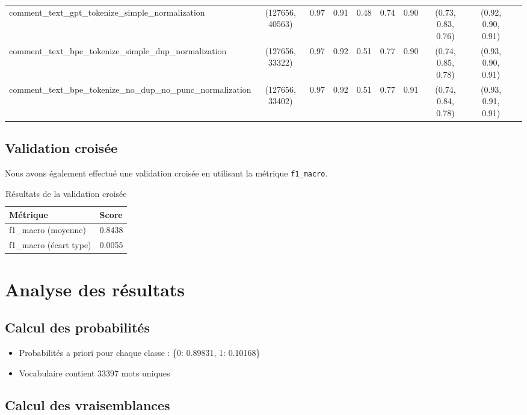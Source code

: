 \begin{table}[htbp]
{\begin{tabular}{@{}lccccccccc@{}}
    comment\_text\_gpt\_tokenize\_simple\_normalization & (127656, 40563) & 0.97 & 0.91 & 0.48 & 0.74 & 0.90 & (0.73, 0.83, 0.76) & (0.92, 0.90, 0.91) \\
    comment\_text\_bpe\_tokenize\_simple\_dup\_normalization & (127656, 33322) & 0.97 & 0.92 & 0.51 & 0.77 & 0.90 & (0.74, 0.85, 0.78) & (0.93, 0.90, 0.91) \\
    comment\_text\_bpe\_tokenize\_no\_dup\_no\_punc\_normalization & (127656, 33402) & 0.97 & 0.92 & 0.51 & 0.77 & 0.91 & (0.74, 0.84, 0.78) & (0.93, 0.91, 0.91) \\
    \bottomrule
    \end{tabular}%
    }
\end{table}


\subsection{Validation croisée}

Nous avons également effectué une validation croisée en utilisant la métrique \texttt{f1\_macro}.

\begin{table}[h]
    \centering
    \begin{tabular}{|l|l|}
    \hline
    \textbf{Métrique} & \textbf{Score} \\ \hline
    f1\_macro (moyenne) & 0.8438 \\ \hline
    f1\_macro (écart type) & 0.0055 \\ \hline
    \end{tabular}
    \caption{Résultats de la validation croisée}
\end{table}

\section{Analyse des résultats}

\subsection{Calcul des probabilités}

\begin{itemize}
    \item Probabilités a priori pour chaque classe : \{0: 0.89831, 1: 0.10168\}
    \item Vocabulaire contient 33397 mots uniques
\end{itemize}

\subsection{Calcul des vraisemblances}

